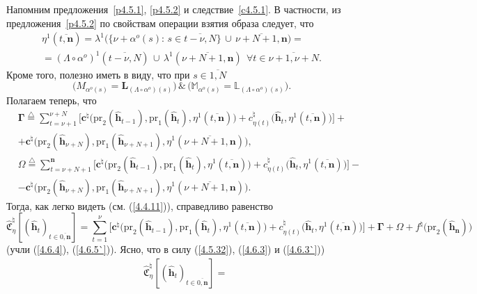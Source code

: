 \documentclass[12pt,twoside]{report}
\newcommand{\df}{\stackrel{\triangle}{=}}
\newcommand{\ov}{\overline}
\newcommand{\La}{\Lambda}
\newcommand{\la}{\lambda}
\newcommand{\al}{\alpha}
\newcommand{\fa}{\forall}
\newcommand{\bbl}{{\mathbb L}}
\newcommand{\bbm}{{\mathbb M}}
\newcommand{\zc}{{\mathbf c}}
\newcommand{\nn}{{\mathbf n}}
\begin{document}
{{Напомним предложения~\ref{p4.5.1}, \ref{p4.5.2} и следствие~\ref{c4.5.1}. В частности,
из предложения~\ref{p4.5.2}  по свойствам операции взятия образа следует, что
\begin{eqnarray}
&\eta^1(\ov{t,\mathbf{n}}) = \la^1\bigl(\{\nu+\al^o(s):\,s\in \ov{t-\nu,N}\}\,\cup\,
\ov{\nu+N+1,\nn}\bigl) =
&\nonumber\\
&= (\La \circ\al^o)^1(\ov{t-\nu,N})\,\cup\, \la^1(\ov{\nu+N+1,\nn})\ \ \fa t\in \ov{\nu+1,\nu+N}.
&\label{4.6.3`}
\end{eqnarray}
Кроме того, полезно иметь в виду, что при $s\in \ov{1,N}$
$$\bigl(M_{\al^o(s)} = \mathbf{L}_{(\La\circ \al^o)(s)}\bigl)\,\&\,\bigl(\bbm_{\al^o(s)} =
\bbl_{(\La\circ \al^o)(s)}\bigl).
$$
Полагаем теперь, что \cite[(5.10), (5.11)]{Cha13`}
\begin{eqnarray}
&\mathbf{\Gamma}\df \sum\limits_{t=\nu+1}^{\nu+N}
\bigl[\zc^\natural\bigl(\mathrm{pr}_2(\hat{\mathbf{h}}_{t-1}),\mathrm{pr}_1(\hat{\mathbf{h}}_t),
\eta^1(\ov{t,\nn})\bigl) + c_{\eta(t)}^\natural\bigl(\hat{\mathbf{h}}_t,\eta^1(\ov{t,\nn})\bigl)\bigl] +
&\nonumber\\
&+\zc^\natural\bigl(\mathrm{pr}_2(\hat{\mathbf{h}}_{\nu+N}),\mathrm{pr}_1
(\hat{\mathbf{h}}_{\nu+N+1}),\eta^1(\ov{\nu+N+1,\nn})\bigl),
&\label{4.6.4}
\end{eqnarray}
\begin{eqnarray}
&\Omega\df \sum\limits_{t=\nu+N+1}^\nn \bigl[\zc^\natural\bigl(\mathrm{pr}_2(\hat{\mathbf{h}}_{t-1}),
\mathrm{pr}_1(\hat{\mathbf{h}}_t),
\eta^1(\ov{t,\nn})\bigl) + c_{\eta(t)}^\natural\bigl(\hat{\mathbf{h}}_t,\eta^1(\ov{t,\nn})\bigl)\bigl] -
&\nonumber\\
&- \zc^\natural\bigl(\mathrm{pr}_2(\hat{\mathbf{h}}_{\nu+N}),\mathrm{pr}_1
(\hat{\mathbf{h}}_{\nu+N+1}),\eta^1(\ov{\nu+N+1,\nn})\bigl).
&\label{4.6.5`}
\end{eqnarray}
Тогда, как легко видеть (см. (\ref{4.4.11})), справедливо равенство
$$
\widehat{\mathfrak{C}}_\eta^\natural[(\hat{\mathbf{h}}_t)_{t\in\ov{0,\nn}}]=
\sum\limits_{t=1}^\nu \bigl[\zc^\natural\bigl(\mathrm{pr}_2(\hat{\mathbf{h}}_{t-1}),
\mathrm{pr}_1(\hat{\mathbf{h}}_t),
\eta^1(\ov{t,\nn})\bigl) + c_{\eta(t)}^\natural\bigl(\hat{\mathbf{h}}_t,\eta^1(\ov{t,\nn})\bigl)\bigl]
+\mathbf{\Gamma} + \Omega +f^\natural\bigl(\mathrm{pr}_2(\hat{\mathbf{h}}_\nn)\bigl)
$$
(учли (\ref{4.6.4}), (\ref{4.6.5`})). Ясно, что в силу (\ref{4.5.32}), (\ref{4.6.3}) и (\ref{4.6.3`}))
\begin{eqnarray}
&\widehat{\mathfrak{C}}_\eta^\natural[(\hat{\mathbf{h}}_t)_{t\in\ov{0,\nn}}]=

\end{eqnarray}}}
\end{document}
